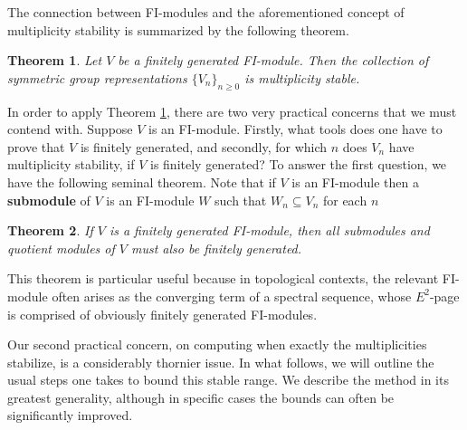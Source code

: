 \documentclass[12pt]{amsart}
\newtheorem{thm}{Theorem}[section]
\theoremstyle{definition}
\begin{document}
The connection between FI-modules and the aforementioned concept of multiplicity stability is summarized by the following theorem.

\begin{thm}\cite{CEF} \label{repstabthm}
Let $V$ be a finitely generated FI-module. Then the collection of symmetric group representations $\{V_n\}_{n \geq 0}$ is multiplicity stable.
\end{thm}

In order to apply Theorem \ref{repstabthm}, there are two very practical concerns that we must contend with. Suppose $V$ is an FI-module. Firstly, what tools does one have to prove that $V$ is finitely generated, and secondly, for which $n$ does $V_n$ have multiplicity stability, if $V$ is finitely generated?
To answer the first question, we have the following seminal theorem. Note that if $V$ is an FI-module then a \textbf{submodule} of $V$ is an FI-module $W$ such that $W_n \subseteq V_n$ for each $n$

\begin{thm} \cite{CEF} \label{Noetherianity}
    If $V$ is a finitely generated FI-module, then all submodules and quotient modules of $V$ must also be finitely generated.
\end{thm}

This theorem is particular useful because in topological contexts, the relevant FI-module often arises as the converging term of a spectral sequence, whose $E^2$-page is comprised of obviously finitely generated FI-modules.

Our second practical concern, on computing when exactly the multiplicities stabilize, is a considerably thornier issue. In what follows, we will outline the usual steps one takes to bound this stable range. We describe the method in its greatest generality, although in specific cases the bounds can often be significantly improved.
\end{document}
